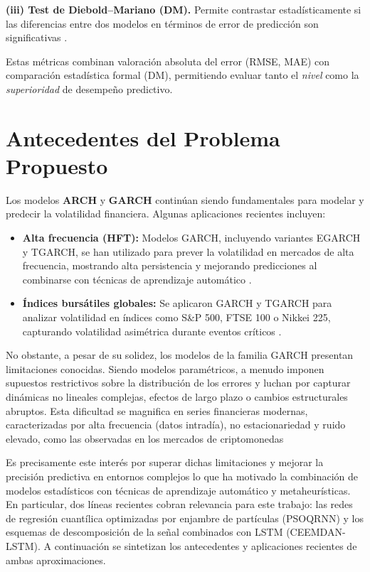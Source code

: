 \documentclass[12pt]{paper}
\begin{document}
\textbf{(iii) Test de Diebold--Mariano (DM).} Permite contrastar estadísticamente si las diferencias entre dos modelos en términos de error de predicción son significativas \cite{diebold1995comparing}.

Estas métricas combinan valoración absoluta del error (RMSE, MAE) con comparación estadística formal (DM), permitiendo evaluar tanto el \emph{nivel} como la \emph{superioridad} de desempeño predictivo.

\section{Antecedentes del Problema Propuesto}

Los modelos \textbf{ARCH} y \textbf{GARCH} continúan siendo fundamentales para modelar y predecir la volatilidad financiera. Algunas aplicaciones recientes incluyen:

\begin{itemize}
    \item \textbf{Alta frecuencia (HFT):} Modelos GARCH, incluyendo variantes EGARCH y TGARCH, se han utilizado para prever la volatilidad en mercados de alta frecuencia, mostrando alta persistencia y mejorando predicciones al combinarse con técnicas de aprendizaje automático \cite{hft2024}.

    \item \textbf{Índices bursátiles globales:} Se aplicaron GARCH y TGARCH para analizar volatilidad en índices como S\&P 500, FTSE 100 o Nikkei 225, capturando volatilidad asimétrica durante eventos críticos \cite{marisetty2024}.

\end{itemize}

No obstante, a pesar de su solidez, los modelos de la familia GARCH presentan limitaciones conocidas. Siendo modelos paramétricos, a menudo imponen supuestos restrictivos sobre la distribución de los errores y luchan por capturar dinámicas no lineales complejas, efectos de largo plazo o cambios estructurales abruptos. Esta dificultad se magnifica en series financieras modernas, caracterizadas por alta frecuencia (datos intradía), no estacionariedad y ruido elevado, como las observadas en los mercados de criptomonedas

Es precisamente este interés por superar dichas limitaciones y mejorar la precisión predictiva en entornos complejos lo que ha motivado la combinación de modelos estadísticos con técnicas de aprendizaje automático y metaheurísticas. En particular, dos líneas recientes cobran relevancia para este trabajo: las redes de regresión cuantílica optimizadas por enjambre de partículas (PSOQRNN) y los esquemas de descomposición de la señal combinados con LSTM (CEEMDAN-LSTM). A continuación se sintetizan los antecedentes y aplicaciones recientes de ambas aproximaciones.
\end{document}
